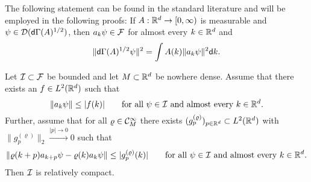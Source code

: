 \documentclass[a4paper,12pt,oneside]{article}
\begin{document}
The following statement can be found in the standard literature and will be employed in the following proofs: If $A:{\mathbb R}^d\to[0,\infty)$ is measurable and $\psi\in{\mathcal D}({\mathsf d}\Gamma(A)^{1/2})$, then $a_k\psi\in {\mathcal F}$ for almost every $k\in{\mathbb R}^d$ and
\begin{equation}\label{eq:operatordecomp}
	\|{\mathsf d}\Gamma(A)^{1/2}\psi\|^2 = \int A(k)\|a_k\psi\|^2 {\mathsf d} k.
\end{equation}
\begin{thm}\label{thm:compactness}
	Let ${\mathcal I}\subset {\mathcal F}$ be bounded and let $M\subset {\mathbb R}^d$ be nowhere dense. Assume that there exists an $f\in L^2 ({\mathbb R}^d)$ such that
	\begin{equation}
		\|a_{k}\psi\| \le |f(k)| \qquad  \mbox{for all}\ \psi\in{\mathcal I}\ \mbox{and}\ \mbox{almost every}\ k\in {\mathbb R}^d. \label{ass:prop.compact-number}
	\end{equation}
	Further, assume that for all $\varrho\in{\mathcal C}^\infty_M$ there exists $(g_p^{(\varrho)})_{p\in {\mathbb R}^d}\subset L^2({\mathbb R}^d)$ with $\|g^{(\varrho)}_p\|_2\xrightarrow{|p|\to 0} 0$ such that%
	\begin{equation}
		 \|\varrho(k+p)a_{k+p}\psi-\varrho(k)a_k\psi\|\le |g^{(\varrho)}_p(k)| \qquad\mbox{for all}\ \psi\in\cI\ \mbox{and}\ \mbox{almost every}\ k\in \IR^d.\label{ass:prop.shift}%
	\end{equation}
	Then ${\mathcal I}$ is relatively compact.
\end{thm}
\end{document}
